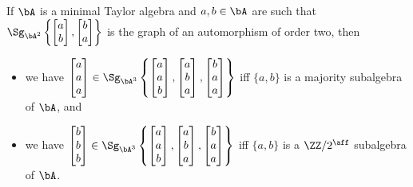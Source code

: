 \begin{prop}\label{prop-recognition-with-automorphism} If $\bA$ is a minimal Taylor algebra and $a, b \in \bA$ are such that $\Sg_{\bA^2}\left\{\begin{bmatrix} a\\ b\end{bmatrix}, \begin{bmatrix} b\\ a\end{bmatrix}\right\}$ is the graph of an automorphism of order two, then
\begin{itemize}
\item we have $\begin{bmatrix} a\\ a\\ a\end{bmatrix} \in \Sg_{\bA^3}\left\{\begin{bmatrix} a\\ a\\ b\end{bmatrix}, \begin{bmatrix} a\\ b\\ a\end{bmatrix}, \begin{bmatrix} b\\ a\\ a\end{bmatrix}\right\}$ iff $\{a,b\}$ is a majority subalgebra of $\bA$, and
\item we have $\begin{bmatrix} b\\ b\\ b\end{bmatrix} \in \Sg_{\bA^3}\left\{\begin{bmatrix} a\\ a\\ b\end{bmatrix}, \begin{bmatrix} a\\ b\\ a\end{bmatrix}, \begin{bmatrix} b\\ a\\ a\end{bmatrix}\right\}$ iff $\{a,b\}$ is a $\ZZ/2^{\aff}$ subalgebra of $\bA$.
\end{itemize}
\end{prop}

